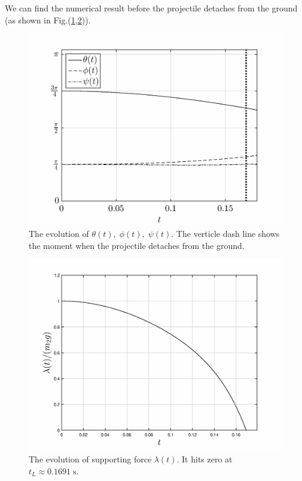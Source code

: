 \documentclass[%
reprint,
amsmath,amssymb,
aps,
]{revtex4-1}
\begin{document}
	We can find the numerical result before the projectile detaches from the ground (as shown in Fig.(\ref{ultdyn},\ref{ultlambda})).
	\begin{figure}[h]
		\centering
		\includegraphics[scale=0.34]{ultlbk1.eps}
		\caption{The evolution of $\theta(t),\;\phi(t),\;\psi(t)$. The verticle dash line shows the moment when the projectile detaches from the ground.}
		\label{ultdyn}
	\end{figure}
	\begin{figure}[h]
		\centering
		\includegraphics[scale=0.34]{lambdalbk1.eps}
		\caption{The evolution of supporting force $\lambda(t)$. It hits zero at $t_L \approx 0.1691\;\mathrm{s}$.}
		\label{ultlambda}
	\end{figure}
\end{document}

